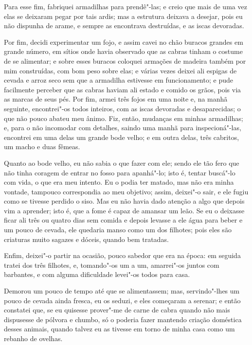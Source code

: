 Para esse fim, fabriquei armadilhas para prendê"-las; e creio que mais de
uma vez elas se deixaram pegar por tais ardis; mas a estrutura deixava a
desejar, pois eu não dispunha de arame, e sempre as encontrava
destruídas, e as iscas devoradas.

Por fim, decidi experimentar um fojo, e assim cavei no chão buracos
grandes em grande número, em sítios onde havia observado que as cabras
tinham o costume de se alimentar; e sobre esses buracos coloquei
armações de madeira também por mim construídas, com bom peso sobre elas;
e várias vezes deixei ali espigas de cevada e arroz seco sem que a
armadilha estivesse em funcionamento; e pude facilmente perceber que as
cabras haviam ali estado e comido os grãos, pois via as marcas de seus
pés. Por fim, armei três fojos em uma noite e, na manhã seguinte,
encontrei"-os todos inteiros, com as iscas devoradas e desaparecidas; o
que não pouco abateu meu ânimo. Fiz, então, mudanças em minhas
armadilhas; e, para o não incomodar com detalhes, saindo uma manhã para
inspecioná"-las, encontrei em uma delas um grande bode velho; e em outra
delas, três cabritos, um macho e duas fêmeas.

Quanto ao bode velho, eu não sabia o que fazer com ele; sendo ele tão
fero que não tinha coragem de entrar no fosso para apanhá"-lo; isto é,
tentar buscá"-lo com vida, o que era meu intento. Eu o podia ter matado,
mas não era minha vontade, tampouco correspondia ao meu objetivo; assim,
deixei"-o sair, e ele fugiu como se tivesse perdido o siso. Mas eu não
havia dado atenção a algo que depois vim a aprender; isto é, que a fome
é capaz de amansar um leão. Se eu o deixasse ficar ali três ou quatro
dias sem comida e depois levasse a ele água para beber e um pouco de
cevada, ele quedaria manso como um dos filhotes; pois eles são criaturas
muito sagazes e dóceis, quando bem tratadas.

Enfim, deixei"-o partir na ocasião, pouco sabedor que era na época: em
seguida tratei dos três filhotes, e, tomando"-os um a um, amarrei"-os
juntos com barbantes, e com alguma dificuldade levei"-os todos para casa.

Demorou um pouco de tempo até que se alimentassem; mas, servindo"-lhes um
pouco de cevada ainda fresca, eu os seduzi, e eles começaram a serenar;
e então constatei que, se eu quisesse prover"-me de carne de cabra quando
não mais dispusesse de pólvora e chumbo, só o poderia fazer mantendo
criação doméstica desses animais, quando talvez eu as tivesse em torno
de minha casa como um rebanho de ovelhas.

